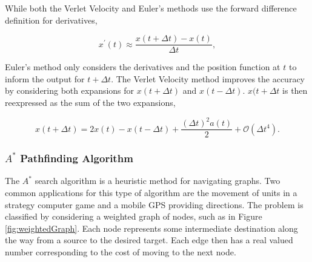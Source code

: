 \documentclass[
]{article}
\begin{document}
While both the Verlet Velocity and Euler's methods use the forward
difference definition for derivatives,

\begin{equation}
x^\prime (t) \approx \frac{x(t + \Delta t) - x(t)}{\Delta t},
\end{equation}

Euler's method only considers the derivatives and the position function
at \(t\) to inform the output for \(t+\Delta t\). The Verlet Velocity
method improves the accuracy by considering both expansions for
\(x(t+\Delta t)\) and \(x(t-\Delta t)\). \(x(t+\Delta t\) is then
reexpressed as the sum of the two expansions,

\begin{equation}
x(t+\Delta t) = 2x(t) - x(t-\Delta t) + \frac{(\Delta t)^2 a(t)}{2} + \mathcal{O}(\Delta t^4) .
\end{equation}

\hypertarget{astarAlgo}{%
\subsubsection{\texorpdfstring{\(A^*\) Pathfinding
Algorithm}{A\^{}* Pathfinding Algorithm}}\label{astarAlgo}}

The \(A^*\) search algorithm is a heuristic method for navigating
graphs. Two common applications for this type of algorithm are the
movement of units in a strategy computer game and a mobile GPS providing
directions. The problem is classified by considering a weighted graph of
nodes, such as in Figure \ref{fig:weightedGraph}. Each node represents
some intermediate destination along the way from a source to the desired
target. Each edge then has a real valued number corresponding to the
cost of moving to the next node.
\end{document}
